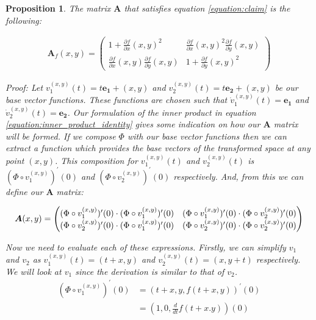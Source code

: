 \documentclass[12pt]{article}
\newtheorem{proposition}{Proposition}
\begin{document}
	\begin{proposition}
		\label{proposition:a_matrix_calc}
		The matrix $\bm{A}$ that satisfies equation \ref{equation:claim} is the following:
		
		\begin{align}
			\bm{A}_f(x, y) = \begin{pmatrix}
				1 + \frac{\partial f}{\partial x}(x, y)^2 & \frac{\partial f}{\partial x}(x, y)^2\frac{\partial f}{\partial y}(x, y) \\
				\frac{\partial f}{\partial x}(x, y)\frac{\partial f}{\partial y}(x, y)   & 1 + \frac{\partial f}{\partial y}(x, y)^2
			\end{pmatrix}
		\end{align}
		
		\noindent Proof: Let $v_1^{(x, y)}(t) = t\bm{e_1} + (x, y)$ and $v_2^{(x, y)}(t) = t\bm{e_2} + (x, y)$ be our base vector functions. These functions are chosen such that $\dot v_1^{(x, y)}(t) = \bm{e_1}$ and $\dot v_2^{(x, y)}(t) = \bm{e_2}$. Our formulation of the inner product in equation \ref{equation:inner_product_identity} gives some indication on how our $\bm{A}$ matrix will be formed. If we compose $\Phi$ with our base vector functions then we can extract a function which provides the base vectors of the transformed space at any point $(x, y)$. This composition for $v_1^{(x, y)}(t)$ and $v_2^{(x, y)}(t)$ is $(\Phi \circ v_1^{(x, y)})^{\prime}(0)$ and $(\Phi \circ v_2^{(x, y)})^{\prime}(0)$ respectively. And, from this we can define our $\bm{A}$ matrix:
		
		\begin{align}
			\centering
			\bm{A}(x, y) = \begin{pmatrix}
				(\Phi \circ v_1^{(x, y)})^{\prime}(0) \cdot (\Phi \circ v_1^{(x, y)})^{\prime}(0) & (\Phi \circ v_1^{(x, y)})^{\prime}(0) \cdot (\Phi \circ v_2^{(x, y)})^{\prime}(0) \\
				(\Phi \circ v_2^{(x, y)})^{\prime}(0) \cdot (\Phi \circ v_1^{(x, y)})^{\prime}(0) & (\Phi \circ v_2^{(x, y)})^{\prime}(0) \cdot (\Phi \circ v_2^{(x, y)})^{\prime}(0)
			\end{pmatrix}
		\end{align}
		
		\noindent Now we need to evaluate each of these expressions. Firstly, we can simplify $v_1$ and $v_2$ as $v_1^{(x, y)}(t) = (t + x, y)$ and $v_2^{(x, y)}(t) = (x, y + t)$ respectively. We will look at $v_1$ since the derivation is similar to that of $v_2$.  
		\begin{align}
			(\Phi \circ v_1^{(x, y)})^{\prime}(0) &= (t + x, y, f(t + x, y))^{\prime}(0) \\
			&= (1, 0, \frac{d}{dt}f(t + x. y))(0)
		\end{align}
		

\end{proposition}
\end{document}
